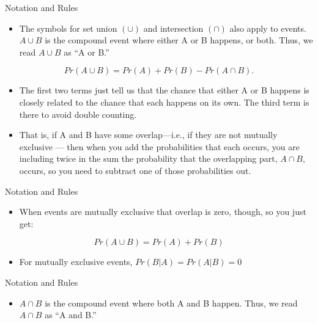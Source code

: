 \documentclass[
  ignorenonframetext,
]{beamer}
\providecommand{\tightlist}{%
  \setlength{\itemsep}{0pt}\setlength{\parskip}{0pt}}
\begin{document}
\begin{frame}{Notation and Rules}
\protect\hypertarget{notation-and-rules-1}{}

\begin{itemize}
\tightlist
\item
  The symbols for set union \((∪)\) and intersection \((∩)\) also apply
  to events. \(A∪B\) is the compound event where either A or B happens,
  or both. Thus, we read \(A∪B\) as ``A or B.''
\end{itemize}

\[Pr(A ∪ B) = Pr(A) + P r(B) − Pr(A ∩ B).\]

\begin{itemize}
\item
  The first two terms just tell us that the chance that either A or B
  happens is closely related to the chance that each happens on its own.
  The third term is there to avoid double counting.
\item
  That is, if A and B have some overlap---i.e., if they are not mutually
  exclusive --- then when you add the probabilities that each occurs,
  you are including twice in the sum the probability that the
  overlapping part, \(A ∩ B\), occurs, so you need to subtract one of
  those probabilities out.
\end{itemize}

\end{frame}

\begin{frame}{Notation and Rules}
\protect\hypertarget{notation-and-rules-2}{}

\begin{itemize}
\tightlist
\item
  When events are mutually exclusive that overlap is zero, though, so
  you just get:
\end{itemize}

\[Pr(A ∪ B) = Pr(A) + Pr(B)\]

\begin{itemize}
\tightlist
\item
  For mutually exclusive events, \(Pr(B|A) = Pr(A|B) = 0\)
\end{itemize}

\end{frame}

\begin{frame}{Notation and Rules}
\protect\hypertarget{notation-and-rules-3}{}

\begin{itemize}
\tightlist
\item
  \(A ∩ B\) is the compound event where both A and B happen. Thus, we
  read \(A∩B\) as ``A and B.''
\end{itemize}

\end{frame}
\end{document}
